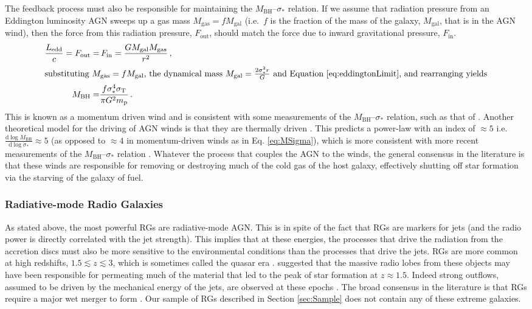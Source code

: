 			The feedback process must also be responsible for maintaining the $M_\text{BH}$--$\sigma_\ast$ relation. If we assume that radiation pressure from an Eddington luminosity AGN sweeps up a gas mass $M_\text{gas} = f M_\text{gal}$ (i.e.\ $f$ is the fraction of the mass of the galaxy, $M_\text{gal}$, that is in the AGN wind), then the force from this radiation pressure, $F_\text{out}$, should match the force due to inward gravitational pressure, $F_\text{in}$.
			\begin{align}
				\frac{L_\text{edd}}{c} = F_\mathrm{out} = & \, F_\text{in} = \frac{G M_\text{gal} M_\text{gas}}{r^2} \, , \\
				\intertext{substituting $M_\text{gas} = f M_\text{gal}$, the dynamical mass $M_\text{gal} = \frac{2\sigma_\ast^2 r}{G}$ and Equation \ref{eq:eddingtonLimit}, and rearranging yields}
				M_\text{BH} = & \frac{f \sigma_\ast^4 \sigma_\mathrm{T}}{\pi G^2 m_\mathrm{p}} \, .
				\label{eq:MSigma}
			\end{align}
			This is known as a momentum driven wind \citep[e.g.][]{Fabian1999} and is consistent with some measurements of the $M_\text{BH}$--$\sigma_\ast$ relation, such as that of \citet{Gultekin2009}.
			Another theoretical model for the driving of AGN winds is that they are thermally driven \citep{Silk1998}. This predicts a power-law with an index of $\approx 5$ i.e.\ $\frac{\mathrm{d} \log M_\mathrm{BH}}{\mathrm{d}\log \sigma_\ast} \approx 5$ (as opposed to $\approx 4$ in momentum-driven winds as in Eq. \ref{eq:MSigma}), which is more consistent with more recent measurements of the $M_\mathrm{BH}$--$\sigma_\ast$ relation \citep[e.g.][]{McConnell2013}. 
			Whatever the process that couples the AGN to the winds, the general consensus in the literature is that these winds are responsible for removing or destroying much of the cold gas of the host galaxy, effectively shutting off star formation via the starving of the galaxy of fuel. 
		\subsubsection{Radiative-mode Radio Galaxies}
			\label{subsubsec:RadiativeRadio}
			As stated above, the most powerful RGs are radiative-mode AGN. This is in spite of the fact that RGs are markers for jets (and the radio power is directly correlated with the jet strength). This implies that at these energies, the processes that drive the radiation from the accretion discs must also be more sensitive to the environmental conditions than the processes that drive the jets. RGs are more common at high redshifts, $1.5 \lesssim z \lesssim 3$, which is sometimes called the quasar era \citep{Miley2008}. \citet{Gopal-Krishna2001} suggested that the massive radio lobes from these objects may have been responsible for permeating much of the material that led to the peak of star formation at $z \approx 1.5$. Indeed strong outflows, assumed to be driven by the mechanical energy of the jets, are observed at these epochs \citep[e.g.][]{Nesvadba2008, Maiolino2012}.
			The broad consensus in the literature is that RGs require a major wet merger to form \citep[e.g.][]{Malin1983, Quillen1992, Lim2000}. Our sample of RGs described in Section \ref{sec:Sample} does not contain any of these extreme galaxies.
